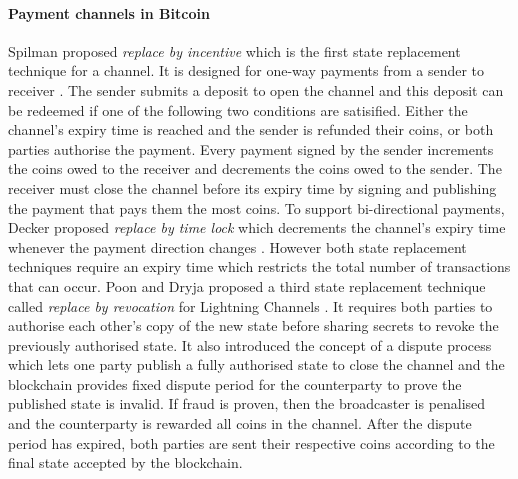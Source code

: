 \documentclass{llncs}
\begin{document}
\paragraph{Payment channels in Bitcoin} 
Spilman proposed \textit{replace by incentive} which is the first state replacement technique for a channel.
It is designed for one-way payments from a sender to receiver \cite{spilman2013}.
The sender submits a deposit to open the channel and this deposit can be redeemed if one of the following two conditions are satisified. 
Either the channel's expiry time is reached and the sender is refunded their coins, or both parties authorise the payment. 
Every payment signed by the sender increments the coins owed to the receiver and decrements the coins owed to the sender.  
The receiver must close the channel before its expiry time by signing and publishing the payment that pays them the most coins. 
To support bi-directional payments, Decker proposed \textit{replace by time lock} which decrements the channel's expiry time whenever the payment direction changes \cite{decker2015fast}.
However both state replacement techniques require an expiry time which restricts the total number of transactions that can occur. 
Poon and Dryja proposed a third state replacement technique called \textit{replace by revocation} for Lightning Channels \cite{poon2016bitcoin}.  
It requires both parties to authorise each other's copy of the new state before sharing secrets to revoke the previously authorised state. 
It also introduced the concept of a dispute process which lets one party publish a fully authorised state to close the channel and the blockchain provides fixed dispute period for the counterparty to prove the published state is invalid.
If fraud is proven, then the broadcaster is penalised and the counterparty is rewarded all coins in the channel.
After the dispute period has expired, both parties are sent their respective coins according to the final state accepted by the blockchain. 
\end{document}
